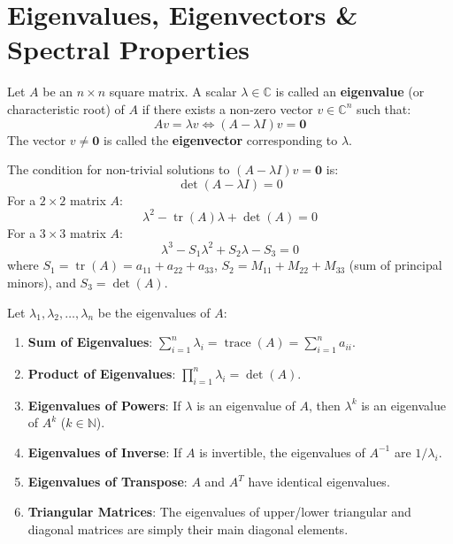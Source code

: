 \section{Eigenvalues, Eigenvectors \& Spectral Properties}

\begin{definition}
Let $A$ be an $n \times n$ square matrix. A scalar $\lambda \in \mathbb{C}$ is called an \textbf{eigenvalue} (or characteristic root) of $A$ if there exists a non-zero vector $v \in \mathbb{C}^n$ such that:
\begin{equation}
A v = \lambda v \iff (A - \lambda I) v = \mathbf{0}
\end{equation}
The vector $v \ne \mathbf{0}$ is called the \textbf{eigenvector} corresponding to $\lambda$.
\end{definition}

\begin{definition}
The condition for non-trivial solutions to $(A - \lambda I) v = \mathbf{0}$ is:
\begin{equation}
\det(A - \lambda I) = 0
\end{equation}
For a $2 \times 2$ matrix $A$:
\begin{equation}
\lambda^2 - \operatorname{tr}(A) \lambda + \det(A) = 0
\end{equation}
For a $3 \times 3$ matrix $A$:
\begin{equation}
\lambda^3 - S_1 \lambda^2 + S_2 \lambda - S_3 = 0
\end{equation}
where $S_1 = \operatorname{tr}(A) = a_{11}+a_{22}+a_{33}$, $S_2 = M_{11}+M_{22}+M_{33}$ (sum of principal minors), and $S_3 = \det(A)$.
\end{definition}

\begin{theorem}
Let $\lambda_1, \lambda_2, \dots, \lambda_n$ be the eigenvalues of $A$:
\begin{enumerate}[leftmargin=1.5em]
    \item \textbf{Sum of Eigenvalues}: $\sum_{i=1}^n \lambda_i = \operatorname{trace}(A) = \sum_{i=1}^n a_{ii}$.
    \item \textbf{Product of Eigenvalues}: $\prod_{i=1}^n \lambda_i = \det(A)$.
    \item \textbf{Eigenvalues of Powers}: If $\lambda$ is an eigenvalue of $A$, then $\lambda^k$ is an eigenvalue of $A^k$ ($k \in \mathbb{N}$).
    \item \textbf{Eigenvalues of Inverse}: If $A$ is invertible, the eigenvalues of $A^{-1}$ are $1/\lambda_i$.
    \item \textbf{Eigenvalues of Transpose}: $A$ and $A^T$ have identical eigenvalues.
    \item \textbf{Triangular Matrices}: The eigenvalues of upper/lower triangular and diagonal matrices are simply their main diagonal elements.
\end{enumerate}
\end{theorem}

